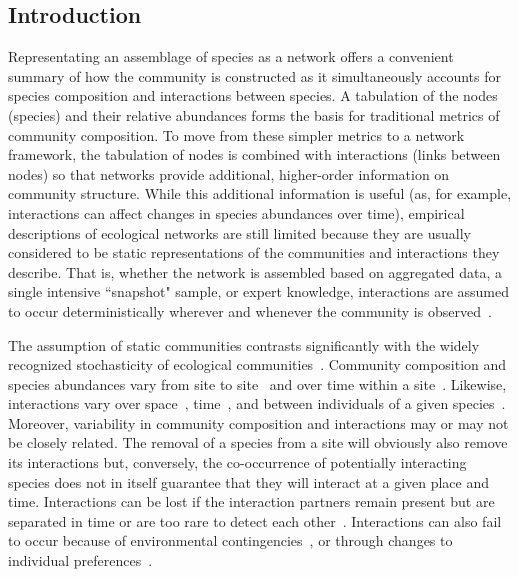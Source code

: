\documentclass[12pt]{article}
\begin{document}
\linenumbers
\begin{spacing}{2.0}
\section*{Introduction}

    Representating an assemblage of species as a network offers a convenient summary of how the community is constructed as it simultaneously accounts for species composition and interactions between species. A tabulation of the nodes (species) and their relative abundances forms the basis for traditional metrics of community composition. To move from these simpler metrics to a network framework, the tabulation of nodes is combined with interactions (links between nodes) so that networks provide additional, higher-order information on community structure. While this additional information is useful (as, for example, interactions can affect changes in species abundances over time), empirical descriptions of ecological networks are still limited because they are usually considered to be static representations of the communities and interactions they describe. That is, whether the network is assembled based on aggregated data, a single intensive ``snapshot" sample, or expert knowledge, interactions are assumed to occur deterministically wherever and whenever the community is observed~\citep{Olesen2011a}. 


    The assumption of static communities contrasts significantly with the widely recognized stochasticity of ecological communities~\citep{Gotelli2000}. Community composition and species abundances vary from site to site~\citep{Baiser2012} and over time within a site~\citep{Olesen2011a}. Likewise, interactions vary over space~\citep{Kitching1987,Baiser2012}, time~\citep{Kitching1987,Olesen2011a}, and between individuals of a given species~\citep{Pires2011a,Fodrie2015,Novak2015}. Moreover, variability in community composition and interactions may or may not be closely related. The removal of a species from a site will obviously also remove its interactions but, conversely, the co-occurrence of potentially interacting species does not in itself guarantee that they will interact at a given place and time. Interactions can be lost if the interaction partners remain present but are separated in time or are too rare to detect each other~\citep{Tylianakis2010}. Interactions can also fail to occur because of environmental contingencies~\citep{Poisot2015}, or through changes to individual preferences~\citep{Fodrie2015}. 



\end{spacing}
\end{document}
